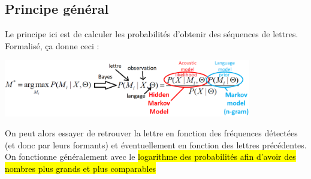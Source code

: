 \documentclass[letterpaper, 12pt]{article}
\newcommand{\alinea}{
\hspace*{0.5cm}}
\begin{document}
		\subsection{Principe général}
			\alinea Le principe ici est de calculer les probabilités d'obtenir des séquences de lettres. Formalisé, ça donne ceci :
			\begin{center}
				\includegraphics[width=4.25in]{Images/dictation}
			\end{center}
			\alinea On peut alors essayer de retrouver la lettre en fonction des fréquences détectées (et donc par leurs formants)
				et éventuellement en fonction des lettres précédentes. On fonctionne généralement avec le \hl{logarithme des probabilités
				afin d'avoir des nombres plus grands et plus comparables}
\end{document}
